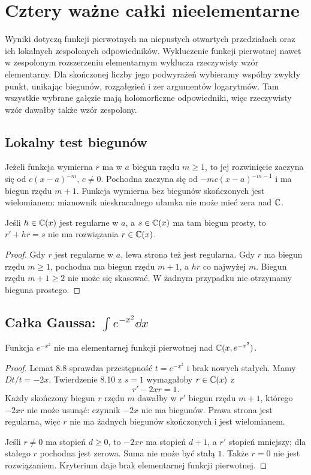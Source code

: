 \chapter{Cztery ważne całki nieelementarne}

Wyniki dotyczą funkcji pierwotnych na niepustych otwartych przedziałach oraz ich lokalnych zespolonych odpowiedników. Wykluczenie funkcji pierwotnej nawet w zespolonym rozszerzeniu elementarnym wyklucza rzeczywisty wzór elementarny. Dla skończonej liczby jego podwyrażeń wybieramy wspólny zwykły punkt, unikając biegunów, rozgałęzień i zer argumentów logarytmów. Tam wszystkie wybrane gałęzie mają holomorficzne odpowiedniki, więc rzeczywisty wzór dawałby także wzór zespolony.

\section{Lokalny test biegunów}

Jeżeli funkcja wymierna $r$ ma w $a$ biegun rzędu $m\ge1$, to jej rozwinięcie zaczyna się od $c(x-a)^{-m}$, $c\ne0$. Pochodna zaczyna się od $-mc(x-a)^{-m-1}$ i ma biegun rzędu $m+1$. Funkcja wymierna bez biegunów skończonych jest wielomianem: mianownik nieskracalnego ułamka nie może mieć zera nad $\mathbb{C}$.

\begin{lemat}
Jeśli $h\in\mathbb{C}(x)$ jest regularne w $a$, a $s\in\mathbb{C}(x)$ ma tam biegun prosty, to $r'+hr=s$ nie ma rozwiązania $r\in\mathbb{C}(x)$.
\end{lemat}
\begin{proof}
Gdy $r$ jest regularne w $a$, lewa strona też jest regularna. Gdy $r$ ma biegun rzędu $m\ge1$, pochodna ma biegun rzędu $m+1$, a $hr$ co najwyżej $m$. Biegun rzędu $m+1\ge2$ nie może się skasować. W żadnym przypadku nie otrzymamy bieguna prostego.
\end{proof}

\section{Całka Gaussa: $\int e^{-x^2}\dd x$}

\begin{twierdzenie}
Funkcja $e^{-x^2}$ nie ma elementarnej funkcji pierwotnej nad $\mathbb{C}(x,e^{-x^2})$.
\end{twierdzenie}
\begin{proof}
Lemat 8.8 sprawdza przestępność $t=e^{-x^2}$ i brak nowych stałych. Mamy $Dt/t=-2x$. Twierdzenie 8.10 z $s=1$ wymagałoby $r\in\mathbb{C}(x)$ z
\[
r'-2xr=1.
\]
Każdy skończony biegun $r$ rzędu $m$ dawałby w $r'$ biegun rzędu $m+1$, którego $-2xr$ nie może usunąć: czynnik $-2x$ nie ma biegunów. Prawa strona jest regularna, więc $r$ nie ma żadnych biegunów skończonych i jest wielomianem.

Jeśli $r\ne0$ ma stopień $d\ge0$, to $-2xr$ ma stopień $d+1$, a $r'$ stopień mniejszy; dla stałego $r$ pochodna jest zerowa. Suma nie może być stałą $1$. Także $r=0$ nie jest rozwiązaniem. Kryterium daje brak elementarnej funkcji pierwotnej.
\end{proof}


